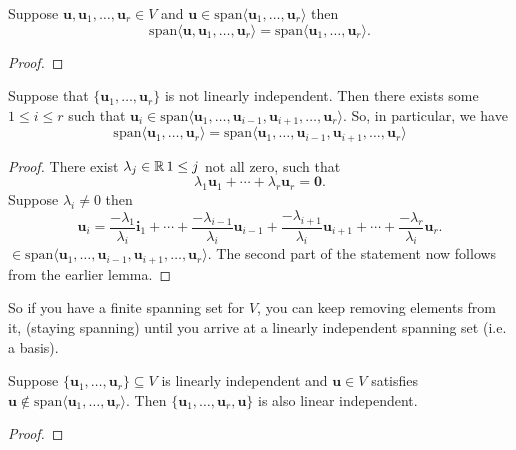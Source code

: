 \documentclass[10pt, a4paper]{article}
\newcommand{\mbf}[1]{\mathbf{#1}}
\begin{document}
\begin{lemma}
    Suppose $\mbf{u}, \mbf{u}_1, \dotsc, \mbf{u}_r \in V$ and $\mbf{u} \in \mathrm{span}\langle\mbf{u}_1, \dotsc, \mbf{u}_r\rangle$ then
    \[
    \mathrm{span}\langle\mbf{u}, \mbf{u}_1, \dotsc, \mbf{u}_r\rangle = \mathrm{span}\langle\mbf{u}_1, \dotsc, \mbf{u}_r\rangle.
    \]
    \begin{proof}
    \end{proof}
\end{lemma}

\begin{lemma}
    Suppose that $\{\mbf{u}_1, \dotsc, \mbf{u}_r\}$ is not linearly independent.
    Then there exists some $1 \leq i \leq r$ such that $\mbf{u}_i \in \mathrm{span}\langle\mbf{u}_1, \dotsc, \mbf{u}_{i - 1}, \mbf{u}_{i + 1}, \dotsc, \mbf{u}_r\rangle$.
    So, in particular,
    we have
    \[
    \mathrm{span}\langle\mbf{u}_1, \dotsc, \mbf{u}_r\rangle = \mathrm{span}\langle\mbf{u}_1, \dotsc, \mbf{u}_{i - 1}, \mbf{u}_{i + 1}, \dotsc, \mbf{u}_r\rangle
    \]
    \begin{proof}
        There exist $\lambda_j \in \mathbb{R}\, 1 \leq j$ not all zero,
        such that
        \[
        \lambda_1\mbf{u}_1 + \dotsi + \lambda_r\mbf{u}_r = \mbf{0}.
        \]
        Suppose $\lambda_i \neq 0$ then
        \[
        \mbf{u}_i = \frac{-\lambda_1}{\lambda_i}\mbf{i}_1 + \dotsi + \frac{-\lambda_{i - 1}}{\lambda_i}\mbf{u}_{i - 1} + \frac{-\lambda_{i + 1}}{\lambda_i}\mbf{u}_{i + 1} + \dotsi + \frac{-\lambda_r}{\lambda_i}\mbf{u}_r.
        \]
        $\in \mathrm{span}\langle\mbf{u}_1, \dotsc, \mbf{u}_{i - 1}, \mbf{u}_{i + 1}, \dotsc, \mbf{u}_r\rangle$.
        The second part of the statement now follows from the earlier lemma.
    \end{proof}
\end{lemma}

So if you have a finite spanning set for $V$,
you can keep removing elements from it,
(staying spanning)
until you arrive at a linearly independent spanning set
(i.e. a basis).

\begin{lemma}
    Suppose $\{\mbf{u}_1, \dotsc, \mbf{u}_r\} \subseteq V$ is linearly independent and $\mbf{u} \in V$ satisfies $\mbf{u} \notin \mathrm{span}\langle\mbf{u}_1, \dotsc, \mbf{u}_r\rangle$.
    Then $\{\mbf{u}_1, \dotsc, \mbf{u}_r, \mbf{u}\}$ is also linear independent.
    \begin{proof}
    \end{proof}
\end{lemma}
\end{document}
